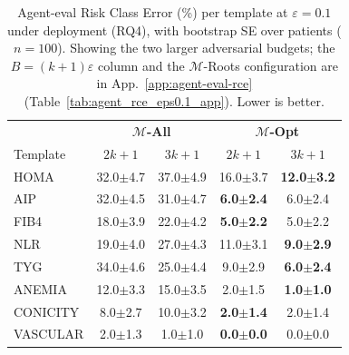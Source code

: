 \providecommand{\pmstd}[1]{{\scriptsize $\pm$#1}}

\begin{table}[h]
\centering
\setlength{\tabcolsep}{2pt}
\caption{Agent-eval Risk Class Error (\%) per template at $\varepsilon = 0.1$ under deployment (RQ4), with bootstrap SE over patients ($n = 100$). Showing the two larger adversarial budgets; the $B = (k{+}1)\varepsilon$ column and the $\mathcal{M}$-Roots configuration are in App.~\ref{app:agent-eval-rce} (Table~\ref{tab:agent_rce_eps0.1_app}). Lower is better.}
\label{tab:rce_per_template}
\begin{tabular}{l|cc|cc}
\toprule
& \multicolumn{2}{c|}{\textbf{$\mathcal{M}$-All}} & \multicolumn{2}{c}{\textbf{$\mathcal{M}$-Opt}} \\
Template & $2k{+}1$ & $3k{+}1$ & $2k{+}1$ & $3k{+}1$ \\
\midrule
HOMA & 32.0\pmstd{4.7} & 37.0\pmstd{4.9} & 16.0\pmstd{3.7} & \textbf{12.0\pmstd{3.2}} \\
AIP & 32.0\pmstd{4.5} & 31.0\pmstd{4.7} & \textbf{6.0\pmstd{2.4}} & 6.0\pmstd{2.4} \\
FIB4 & 18.0\pmstd{3.9} & 22.0\pmstd{4.2} & \textbf{5.0\pmstd{2.2}} & 5.0\pmstd{2.2} \\
NLR & 19.0\pmstd{4.0} & 27.0\pmstd{4.3} & 11.0\pmstd{3.1} & \textbf{9.0\pmstd{2.9}} \\
TYG & 34.0\pmstd{4.6} & 25.0\pmstd{4.4} & 9.0\pmstd{2.9} & \textbf{6.0\pmstd{2.4}} \\
ANEMIA & 12.0\pmstd{3.3} & 15.0\pmstd{3.5} & 2.0\pmstd{1.5} & \textbf{1.0\pmstd{1.0}} \\
CONICITY & 8.0\pmstd{2.7} & 10.0\pmstd{3.2} & \textbf{2.0\pmstd{1.4}} & 2.0\pmstd{1.4} \\
VASCULAR & 2.0\pmstd{1.3} & 1.0\pmstd{1.0} & \textbf{0.0\pmstd{0.0}} & 0.0\pmstd{0.0} \\
\bottomrule
\end{tabular}
\end{table}
